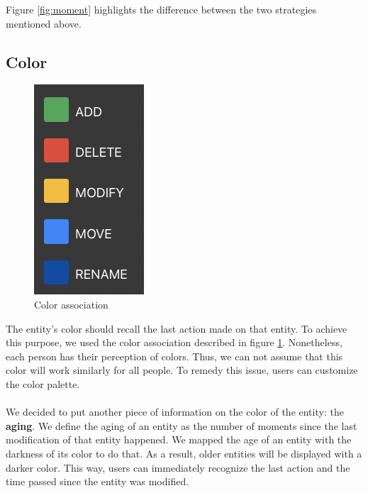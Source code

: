 Figure \ref{fig:moment} highlights the difference between the two strategies mentioned above. 


\subsection*{Color}
\begin{figure}
    \begin{center}
        \includegraphics[width=0.7\linewidth]{ColorAssociation.png} 
        \caption{Color association}
        \label{fig:ColorAssociation}
    \end{center}
\end{figure}

The entity's color should recall the last action made on that entity. To achieve this purpose, we used the color association described in figure \ref{fig:ColorAssociation}.
Nonetheless, each person has their perception of colors. Thus, we can not assume that this color will work similarly for all people.
To remedy this issue, users can customize the color palette. \\
\\
We decided to put another piece of information on the color of the entity: the \textbf{aging}. 
We define the aging of an entity as the number of moments since the last modification of that entity happened.
We mapped the age of an entity with the darkness of its color to do that. 
As a result, older entities will be displayed with a darker color. 
This way, users can immediately recognize the last action and the time passed since the entity was modified.


